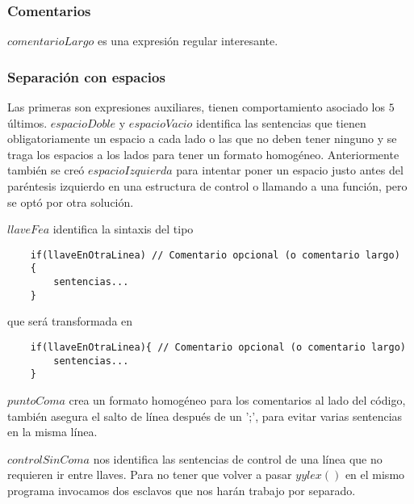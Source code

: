 \documentclass[11pt,spanish]{article} %
\begin{document}
\vspace{0.4cm}
\subsubsection{Comentarios}

$comentarioLargo$ es una expresión regular interesante.

\vspace{0.4cm}
\subsubsection{Separación con espacios}

Las primeras son expresiones auxiliares, tienen comportamiento asociado los $5$ últimos.
$espacioDoble$ y $espacioVacio$ identifica las sentencias que tienen obligatoriamente un espacio a cada lado o las que no deben tener ninguno y se traga los espacios a los lados para tener un formato homogéneo.
Anteriormente también se creó $espacioIzquierda$ para intentar poner un espacio justo antes del paréntesis izquierdo en una estructura de control o llamando a una función, pero se optó por otra solución.

$llaveFea$ identifica la sintaxis del tipo
\begin{lstlisting}
	if(llaveEnOtraLinea) // Comentario opcional (o comentario largo)
	{
		sentencias...
	}
\end{lstlisting}
que será transformada en
\begin{lstlisting}
	if(llaveEnOtraLinea){ // Comentario opcional (o comentario largo)
		sentencias...
	}
\end{lstlisting}

\vspace{0.2cm}
$puntoComa$ crea un formato homogéneo para los comentarios al lado del código, también asegura el salto de línea después de un ';', para evitar varias sentencias en la misma línea.

\vspace{0.2cm}
$controlSinComa$ nos identifica las sentencias de control de una línea que no requieren ir entre llaves.
Para no tener que volver a pasar $yylex()$ en el mismo programa invocamos dos esclavos que nos harán trabajo por separado.

\vspace{0.5cm}
\end{document}
